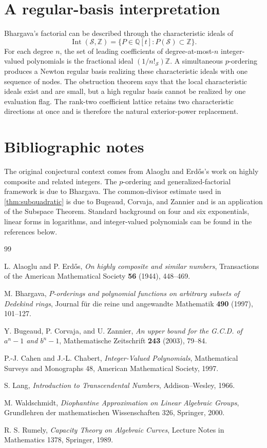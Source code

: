 \documentclass[11pt]{article}
\theoremstyle{definition}
\theoremstyle{remark}
\newcommand{\Z}{\mathbb Z}
\newcommand{\Q}{\mathbb Q}
\newcommand{\Int}{\operatorname{Int}}
\newcommand{\calS}{\mathcal S}
\begin{document}
\section{A regular-basis interpretation}

Bhargava's factorial can be described through the characteristic ideals of
\[
       \Int(\calS,\Z)=\{P\in\Q[t]:P(\calS)\subset\Z\}.
\]
For each degree $n$, the set of leading coefficients of degree-at-most-$n$ integer-valued polynomials is the fractional ideal $(1/n!_{\calS})\Z$.  A simultaneous $p$-ordering produces a Newton regular basis realizing these characteristic ideals with one sequence of nodes.  The obstruction theorem says that the local characteristic ideals exist and are small, but a high regular basis cannot be realized by one evaluation flag.  The rank-two coefficient lattice retains two characteristic directions at once and is therefore the natural exterior-power replacement.

\section{Bibliographic notes}

The original conjectural context comes from Alaoglu and Erd\H{o}s's work on highly composite and related integers.  The $p$-ordering and generalized-factorial framework is due to Bhargava.  The common-divisor estimate used in \cref{thm:subquadratic} is due to Bugeaud, Corvaja, and Zannier and is an application of the Subspace Theorem.  Standard background on four and six exponentials, linear forms in logarithms, and integer-valued polynomials can be found in the references below.

\begin{thebibliography}{99}

L. Alaoglu and P. Erd\H{o}s,
\emph{On highly composite and similar numbers},
Transactions of the American Mathematical Society \textbf{56} (1944), 448--469.

M. Bhargava,
\emph{$P$-orderings and polynomial functions on arbitrary subsets of Dedekind rings},
Journal f\"ur die reine und angewandte Mathematik \textbf{490} (1997), 101--127.

Y. Bugeaud, P. Corvaja, and U. Zannier,
\emph{An upper bound for the G.C.D. of $a^n-1$ and $b^n-1$},
Mathematische Zeitschrift \textbf{243} (2003), 79--84.

P.-J. Cahen and J.-L. Chabert,
\emph{Integer-Valued Polynomials},
Mathematical Surveys and Monographs 48, American Mathematical Society, 1997.

S. Lang,
\emph{Introduction to Transcendental Numbers},
Addison--Wesley, 1966.

M. Waldschmidt,
\emph{Diophantine Approximation on Linear Algebraic Groups},
Grundlehren der mathematischen Wissenschaften 326, Springer, 2000.

R. S. Rumely,
\emph{Capacity Theory on Algebraic Curves},
Lecture Notes in Mathematics 1378, Springer, 1989.

\end{thebibliography}
\end{document}
